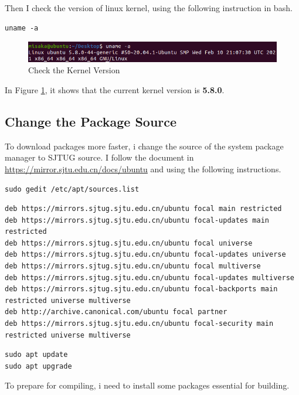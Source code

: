 \documentclass[UTF8,10pt,a4paper]{article}
\theoremstyle{Problem}
\theoremstyle{Solution}
\begin{document}
Then I check the version of linux kernel, using the following instruction in bash.

\begin{lstlisting}
uname -a
\end{lstlisting}

\begin{figure}[H]
    \centering
    \includegraphics[width=380pt]{3.png}
    \caption{Check the Kernel Version}
    \label{3}
\end{figure}

In Figure \ref{3}, it shows that the current kernel version is \textbf{5.8.0}.

\subsection{Change the Package Source}
To download packages more faster, i change the source of the system package manager to SJTUG source. I follow the document in \underline{https://mirror.sjtu.edu.cn/docs/ubuntu} and using the following instructions.

\begin{lstlisting}
sudo gedit /etc/apt/sources.list
\end{lstlisting}

\begin{lstlisting}
deb https://mirrors.sjtug.sjtu.edu.cn/ubuntu focal main restricted
deb https://mirrors.sjtug.sjtu.edu.cn/ubuntu focal-updates main restricted
deb https://mirrors.sjtug.sjtu.edu.cn/ubuntu focal universe
deb https://mirrors.sjtug.sjtu.edu.cn/ubuntu focal-updates universe
deb https://mirrors.sjtug.sjtu.edu.cn/ubuntu focal multiverse
deb https://mirrors.sjtug.sjtu.edu.cn/ubuntu focal-updates multiverse
deb https://mirrors.sjtug.sjtu.edu.cn/ubuntu focal-backports main restricted universe multiverse
deb http://archive.canonical.com/ubuntu focal partner
deb https://mirrors.sjtug.sjtu.edu.cn/ubuntu focal-security main restricted universe multiverse
\end{lstlisting}

\begin{lstlisting}
sudo apt update
sudo apt upgrade
\end{lstlisting}

To prepare for compiling, i need to install some packages essential for building.
\end{document}
